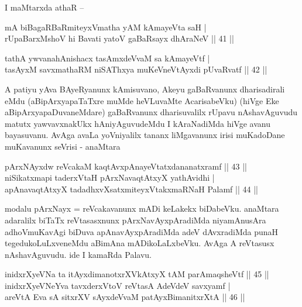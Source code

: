 \begin{artha}
I maMtarxda athaR {\rm --}
\end{artha}

\begin{shl}
mA biBagaRBaRmiteyxVmatha yAM kAmayeVta saH | \\
rUpaBarxMshoV hi Bavati yatoV gaBaRsayx dhAraNeV \hfill|| 41 || 
\end{shl}

\begin{shl}
tathA ywvanahAnishacx tasAmxdeVvaM sa kAmayeVtf | \\
tasAyxM savxmathaRM niSAThxya muKeVneVtAyxdi pUvaRvatf \hfill|| 42 || 
\end{shl}

\begin{artha}
A patiyu yAva BAyeRyanunx kAmisuvano, Akeyu gaBaRvanunx dharisadirali 
eMdu (aBipArxyapaTaTxre muMde heVLuvaMte AcarisabeVku) (hiVge Eke 
aBipArxyapaDuvaneMdare) gaBaRvanunx dharisuvalilx rUpavu nAshavAguvudu 
matutx yawvavxnakUkx hAniyAguvudeMdu I kAraNadiMda hiVge avanu 
bayasuvanu. AvAga avaLa yoVniyalilx tananx liMgavanunx irisi 
muKadoDane muKavanunx seVrisi - anaMtara
\end{artha}

\begin{shl}
pArxNAyx\s \s dw reVcakaM kaqtAvx\s pAnayeVtatxdananatxramf \hfill|| 43 || \\
niSikatxmapi taderxVtaH pArxNavaqtAtxyX yathAvidhi | \\
apAnavaqtAtxyX tadadhxvXsatxmiteyxVtakxmaRNaH Palamf \hfill|| 44 || 
\end{shl}

\begin{artha}
modalu pArxNayx = reVcakavanunx mADi keLakekx biDabeVku. anaMtara 
adaralilx biTaTx reVtasasxnunx pArxNavAyxpAradiMda niyamAnusAra 
adhoVmuKavAgi biDuva apAnavAyxpAradiMda adeV dAvxradiMda punaH 
tegedukoLuLxveneMdu aBimAna mADikoLaLxbeVku. AvAga A reVtasusx 
nAshavAguvudu. ide I kamaRda Palavu.
\end{artha}


\begin{shl}
inidxrXyeVNa ta itAyxdimanotxrXVkAtxyX tAM parAmaqsheVtf \hfill|| 45 || \\
\footnotemark[1]inidxrXyeVNeYva tavxderxVtoV reVtasA AdeVdeV savxyamf | \\
areVtA Eva sA sitxrXV sAyxdeVvaM patAyx\s BimanitxrXtA \hfill|| 46 || 
\end{shl}

